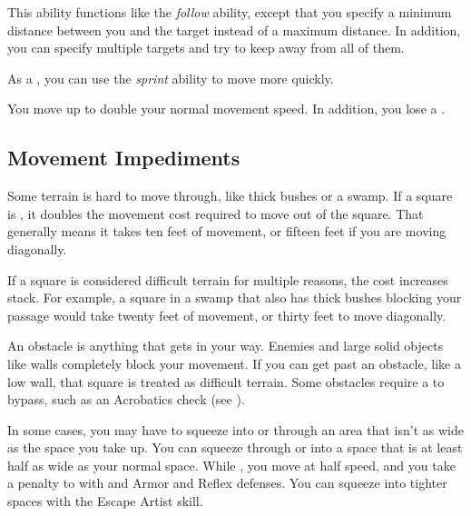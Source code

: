         \begin{freeability}{}
            This ability functions like the \textit{follow} ability, except that you specify a minimum distance between you and the target instead of a maximum distance.
            In addition, you can specify multiple targets and try to keep away from all of them.
        \end{freeability}

         As a , you can use the \textit{sprint} ability to move more quickly.

        \begin{freeability}{}
            You move up to double your normal movement speed.
            In addition, you lose a .
        \end{freeability}

    \subsection{Movement Impediments}

        \label{Difficult Terrain}
        Some terrain is hard to move through, like thick bushes or a swamp.
        If a square is , it doubles the movement cost required to move out of the square.
        That generally means it takes ten feet of movement, or fifteen feet if you are moving diagonally.

        If a square is considered difficult terrain for multiple reasons, the cost increases stack.
        For example, a square in a swamp that also has thick bushes blocking your passage would take twenty feet of movement, or thirty feet to move diagonally.

        An obstacle is anything that gets in your way. Enemies and large solid objects like walls completely block your movement. If you can get past an obstacle, like a low wall, that square is treated as difficult terrain. Some obstacles require a  to bypass, such as an Acrobatics check (see ).

        \label{Squeezing}
        In some cases, you may have to squeeze into or through an area that isn't as wide as the space you take up.
        You can squeeze through or into a space that is at least half as wide as your normal space.
        While , you move at half speed, and you take a  penalty to  with  and Armor and Reflex defenses.
        You can squeeze into tighter spaces with the Escape Artist skill.

